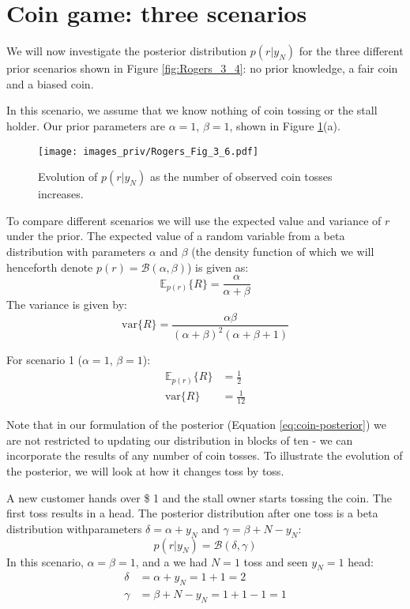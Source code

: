\section{Coin game: three scenarios}

We will now investigate the posterior distribution $p(r|y_N)$ for the three different
prior scenarios shown in Figure \ref{fig:Rogers_3_4}:
no prior knowledge, a fair coin and a biased
coin.

In this scenario, we assume that we know
nothing of coin tossing or the stall holder. Our prior parameters are $\alpha = 1$, $\beta = 1$,
shown in Figure \ref{fig:Rogers_3_6}(a).

\begin{figure}[h]
{\centering
\texttt{[image: images\_priv/Rogers\_Fig\_3\_6.pdf]}
\par}
\caption{Evolution of $p(r|y_N)$ as the number of observed coin tosses increases.}
\label{fig:Rogers_3_6}
\end{figure}


To compare different scenarios we will use the expected value and variance of $r$
under the prior. The expected value of a random variable from a beta distribution
with parameters $\alpha$ and $\beta$ (the density function of which we will henceforth denote
$p(r) = \mathcal{B}(\alpha,\beta)$) is given as:
\begin{equation}
\mathbb{E}_{p(r)} \{ R \} = \frac{\alpha}{\alpha + \beta}
\label{eq:expect-beta-r}
\end{equation}
The variance is given by:
\begin{equation}
\mathrm{var}\{R\} = \frac{\alpha \beta}{(\alpha + \beta)^2 (\alpha + \beta + 1)}
\label{eq:variance-beta-r}
\end{equation}

For scenario 1 ($\alpha=1$, $\beta=1$):
\begin{align*}
\mathbb{E}_{p(r)} \{ R \} & = \frac{1}{2} \\
\mathrm{var}\{R\} & = \frac{1}{12}
\end{align*}

Note that in our formulation of the posterior (Equation \eqref{eq:coin-posterior})
we are not restricted
to updating our distribution in blocks of ten - we can incorporate the results of any
number of coin tosses.
To illustrate the evolution of the posterior, we will look at
how it changes toss by toss.

A new customer hands over \$ 1 and the stall owner starts tossing the coin.
The first toss results in a head. The posterior distribution after one toss is a beta
distribution withparameters $\delta = \alpha + y_N$ and $\gamma = \beta + N - y_{N}$:
\begin{equation*}
p(r|y_N) = \mathcal{B}(\delta,\gamma)
\end{equation*}
In this scenario, $\alpha = \beta = 1$, and a we had $N = 1$ toss and seen $y_N = 1$ head:
\begin{align*}
\delta & = \alpha + y_N    =  1 + 1 = 2 \\
\gamma & = \beta + N - y_N =  1 + 1 - 1 = 1 \\
\end{align*}

